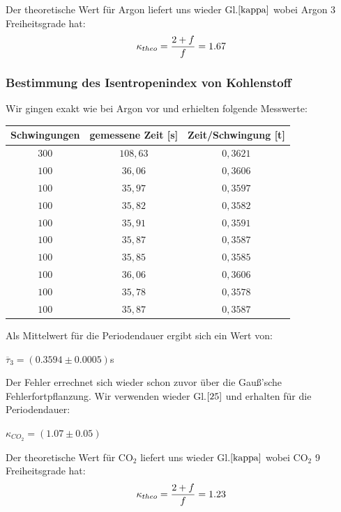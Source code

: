 \documentclass{article}
\begin{document}
{{{Der theoretische Wert für Argon liefert uns wieder Gl.\(\eqref{kappa}\) wobei Argon 3 Freiheitsgrade hat:
\begin{equation}
\notag
\kappa_{theo} = \frac{2+f}{f} = 1.67
\end{equation}

\subsubsection{Bestimmung des Isentropenindex von Kohlenstoff}
Wir gingen exakt wie bei Argon vor und erhielten folgende Messwerte:
\begin{center}
\begin{tabular}{c|c|c}
Schwingungen & gemessene Zeit [s]& Zeit/Schwingung [t]\\
\hline 
\(300\)	& \(108,63\) & \(0,3621\)\\
\(100\)	& \(36,06\)	& \(0,3606\)\\
\(100\)	& \(35,97\)	& \(0,3597\)\\
\(100\)	& \(35,82\)	& \(0,3582\)\\
\(100\)	& \(35,91\)	& \(0,3591\)\\
\(100\)	& \(35,87\)	& \(0,3587\)\\
\(100\)	& \(35,85\)	& \(0,3585\)\\
\(100\)	& \(36,06\)	& \(0,3606\)\\
\(100\)	& \(35,78\)	& \(0,3578\)\\
\(100\)	& \(35,87\)	& \(0,3587\)\\
\end{tabular}
\end{center}

\vspace{1cm}

Als Mittelwert für die Periodendauer ergibt sich ein Wert von:
\begin{center}
\(\overline{\tau}_{3} = (0.3594 \pm 0.0005)\)s
\end{center}

Der Fehler errechnet sich wieder schon zuvor über die Gauß'sche Fehlerfortpflanzung.
Wir verwenden wieder Gl.\(\eqref{25}\) und erhalten für die Periodendauer:
\begin{center}
\(\kappa_{CO_2} = (1.07 \pm 0.05)\)
\end{center}

Der theoretische Wert für CO\(_2\) liefert uns wieder Gl.\(\eqref{kappa}\) wobei CO\(_2\) 9 Freiheitsgrade hat:
\begin{equation}
\notag
\kappa_{theo} = \frac{2+f}{f} = 1.23
\end{equation}

}}}
\end{document}
